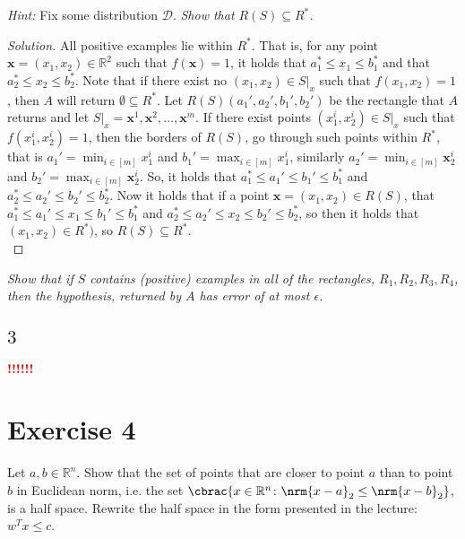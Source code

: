 \documentclass[10pt, a4paper, twoside]{amsart}
\newcommand{\R}{\ensuremath{\mathbb{R}}}
\DeclarePairedDelimiter\cbrac\{\}
\DeclarePairedDelimiter{\nrm}\lVert\rVert
\renewcommand{\c}{\ensuremath{\colon}}
\newenvironment{solution}
               {\let\oldqedsymbol=\qedsymbol
                \renewcommand{\qedsymbol}{$\blacktriangleleft$}
                \begin{proof}[Solution]}
               {\end{proof}
                \renewcommand{\qedsymbol}{\oldqedsymbol}}
\newcommand{\TODO}{\textcolor{red}{\textbf{!!!!!! }}}
\begin{document}
\textit{Hint:} Fix some distribution $\mathcal{D}$.
\textit{Show that $R(S)\subseteq R^*$.}
\begin{solution}
All positive examples lie within $R^*$. That is, for any point $\mathbf{x} = (x_1,x_2) \in \R^2$ such that $f(\mathbf{x})=1$, it holds that $a_1^*\leq x_1 \leq b_1^*$ and that $a_2^*\leq x_2 \leq b_2^*$. Note that if there exist no $(x_1,x_2) \in S|_x$ such that $f(x_1,x_2)=1$, then $A$ will return $\emptyset \subseteq R^*$. Let $R(S)(a_1',a_2',b_1',b_2')$ be the rectangle that $A$ returns and let $S|_x = {\mathbf{x}^1, \mathbf{x}^2,\ldots, \mathbf{x}^m}$. If there exist points $(x^i_1,x^i_2)\in S|_x$ such that $f(x^i_1,x^i_2)=1$, then the borders of $R(S)$, go through such points within $R^*$, that is $a_1' = \min_{i\in [m]} x^i_1$ and $b_1' = \max_{i\in [m]} x^i_1$, similarly $a_2' = \min_{i\in [m]} \mathbf{x}^i_2$ and $b_2' = \max_{i\in [m]} \mathbf{x}^i_2$. So, it holds that $a_1^*\leq a_1'\leq b_1' \leq b_1^*$ and $a_2^* \leq a_2' \leq b_2' \leq b_2^*$. Now it holds that if a point $\mathbf{x} = (x_1, x_2)\in R(S)$, that $a_1^*\leq a_1'\leq x_1 \leq b_1' \leq b_1^*$ and $a_2^* \leq a_2'\leq x_2 \leq b_2' \leq b_2^*$, so then it holds that $(x_1,x_2) \in R^*)$, so $R(S) \subseteq R^*$.\\
\end{solution}
\textit{Show that if $S$ contains (positive) examples in all of the rectangles, $R_1, R_2, R_3, R_4$, then the hypothesis, returned by $A$ has error of at most $\epsilon$.}
\subsection*{$3$}
\TODO



\section*{Exercise 4}
Let $a, b \in \R^n$. 
Show that the set of points that are closer to point $a$ than to point $b$ in Euclidean norm, 
i.e. the set $\cbrac{x \in \R^n \c \nrm{x-a}_2 \leq \nrm{x-b}_2}$, is a half space. 
Rewrite the half space in the form presented in the lecture: $w^T x \leq c$.
\end{document}
